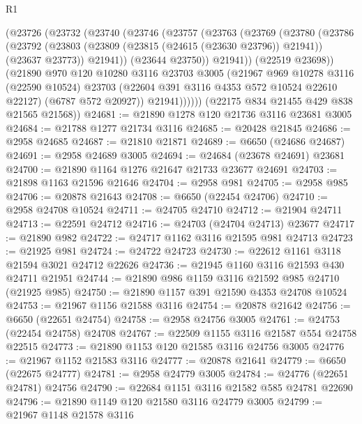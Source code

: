 \begin{lexlean}{R1}
\begin{coremodule}
        (@23726
          (@23732
            (@23740
              (@23746
                (@23757
                  (@23763
                    (@23769
                      (@23780
                        (@23786
                          (@23792
                            (@23803
                              (@23809 (@23815 (@24615 (@23630 @23796)) @21941))
                              (@23637 @23773))
                            @21941))
                        (@23644 @23750))
                      @21941))
                  (@22519 @23698))
                (@21890
                  @970
                  @120
                  @10280
                  @3116
                  @23703
                  @3005
                  (@21967
                    @969
                    @10278
                    @3116
                    (@22590 @10524)
                    @23703
                    (@22604 @391 @3116 @4353 @572 @10524 @22610 @22127)
                    (@6787 @572 @20927))
                  @21941))))))
      (@22175 @834 @21455 @429 @838 @21565 @21568))
@24681 := @21890 @1278 @120 @21736 @3116 @23681 @3005
@24684 := @21788 @1277 @21734 @3116
@24685 := @20428 @21845
@24686 := @2958 @24685
@24687 := @21810 @21871
@24689 := @6650 (@24686 @24687)
@24691 := @2958 @24689 @3005
@24694 := @24684 (@23678 @24691) @23681
@24700 := @21890 @1164 @1276 @21647 @21733 @23677 @24691
@24703 := @21898 @1163 @21596 @21646
@24704 := @2958 @981
@24705 := @2958 @985
@24706 := @20878 @21643
@24708 := @6650 (@22454 @24706)
@24710 := @2958 @24708 @10524
@24711 := @24705 @24710
@24712 := @21904 @24711
@24713 := @22591 @24712
@24716 := @24703 (@24704 @24713) @23677
@24717 := @21890 @982
@24722 := @24717 @1162 @3116 @21595 @981 @24713
@24723 := @21925 @981
@24724 := @24722 @24723
@24730 := @22612 @1161 @3118 @21594 @3021 @24712 @22626
@24736 := @21945 @1160 @3116 @21593 @430 @24711 @21951
@24744 := @21890 @986 @1159 @3116 @21592 @985 @24710 (@21925 @985)
@24750 := @21890 @1157 @391 @21590 @4353 @24708 @10524
@24753 := @21967 @1156 @21588 @3116
@24754 := @20878 @21642
@24756 := @6650 (@22651 @24754)
@24758 := @2958 @24756 @3005
@24761 := @24753 (@22454 @24758) @24708
@24767 := @22509 @1155 @3116 @21587 @554 @24758 @22515
@24773 := @21890 @1153 @120 @21585 @3116 @24756 @3005
@24776 := @21967 @1152 @21583 @3116
@24777 := @20878 @21641
@24779 := @6650 (@22675 @24777)
@24781 := @2958 @24779 @3005
@24784 := @24776 (@22651 @24781) @24756
@24790 := @22684 @1151 @3116 @21582 @585 @24781 @22690
@24796 := @21890 @1149 @120 @21580 @3116 @24779 @3005
@24799 := @21967 @1148 @21578 @3116

\end{coremodule}
\end{lexlean}

